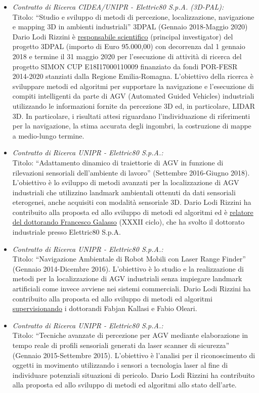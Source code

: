 \documentclass[11pt]{article}
\newcommand{\ITEMDATE}[1]{\item \textit{#1:}\\}
\begin{document}
\begin{itemize}
\begin{itemize}
\ITEMDATE{Contratto di Ricerca CIDEA/UNIPR - Elettric80 S.p.A. (3D-PAL)} 
Titolo: ``Studio e sviluppo di metodi di percezione, localizzazione, navigazione e mapping 3D in ambienti industriali'' 3DPAL (Gennaio 2018-Maggio 2020)
Dario Lodi Rizzini \`e \underline{responsabile scientifico} (principal investigator) del progetto 3DPAL (importo di Euro 95.000,00) con decorrenza dal 1 gennaio 2018 e termine 
il 31 maggio 2020 per l'esecuzione di attivit\`a di ricerca del progetto SIMON CUP E18I17000110009 finanziato da fondi POR-FESR 2014-2020 
stanziati dalla Regione Emilia-Romagna. 
L'obiettivo della ricerca \`e sviluppare metodi ed algoritmi per supportare la navigazione e l'esecuzione di compiti intelligenti
da parte di AGV (Automated Guided Vehicles) industriali utilizzando le informazioni fornite da percezione 3D ed, in particolare, LIDAR 3D. 
In particolare, i risultati attesi riguardano l'individuazione di riferimenti per la navigazione, la stima accurata degli ingombri, 
la costruzione di mappe a medio-lungo termine. 

\ITEMDATE{Contratto di Ricerca UNIPR - Elettric80 S.p.A.} 
Titolo: ``Adattamento dinamico di traiettorie di AGV in funzione di rilevazioni sensoriali dell'ambiente di lavoro'' (Settembre 2016-Giugno 2018). 
L'obiettivo \`e lo sviluppo di metodi avanzati per la localizzazione di AGV industriali 
che utilizzino landmark ambientali ottenuti da dati sensoriali eterogenei, anche acquisiti con modalit\`a sensoriale 3D. 
Dario Lodi Rizzini ha contribuito alla proposta ed allo sviluppo di metodi ed algoritmi 
ed \`e \ul{relatore del dottorando Francesco Galasso} (XXXII ciclo), che ha svolto il dottorato industriale presso Elettric80 S.p.A.

\ITEMDATE{Contratto di Ricerca UNIPR - Elettric80 S.p.A.} 
Titolo: ``Navigazione Ambientale di Robot Mobili con Laser Range Finder'' (Gennaio 2014-Dicembre 2016). 
L'obiettivo \`e lo studio e la realizzazione di metodi per la localizzazione di AGV industriali 
senza impiegare landmark artificiali come invece avviene nei sistemi commerciali.
Dario Lodi Rizzini ha contribuito alla proposta ed allo sviluppo di metodi ed algoritmi 
\ul{supervisionando} i dottorandi Fabjan Kallasi e Fabio Oleari.

\ITEMDATE{Contratto di Ricerca UNIPR - Elettric80 S.p.A.} 
Titolo: ``Tecniche avanzate di percezione per AGV mediante elaborazione in tempo reale di profili sensoriali generati da laser scanner di sicurezza'' (Gennaio 2015-Settembre 2015). 
L'obiettivo \`e l'analisi per il riconoscimento di oggetti in movimento utilizzando 
i sensori a tecnologia laser al fine di individuare potenziali situazioni di pericolo.
Dario Lodi Rizzini ha contribuito alla proposta ed allo sviluppo di metodi ed algoritmi 
allo stato dell'arte.


\end{itemize}
\end{itemize}
\end{document}
